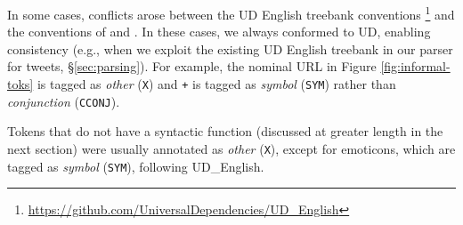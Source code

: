 \documentclass[11pt,a4paper]{article}
\newcommand{\yjcomment}[1]{\textcolor{orange}{[$_\mathrm{L}^\mathrm{Y}$#1]}}
\begin{document}
In some cases, conflicts arose between the UD English 
treebank conventions \cite[UD\_English]{Marneffe2014UniversalSD}
\footnote{\url{https://github.com/UniversalDependencies/UD_English}}
and the conventions of  and
.  In these cases, we always
conformed to UD, enabling consistency (e.g., when we exploit the
existing UD English treebank in our parser for tweets, \S\ref{sec:parsing}).  For example,  
the nominal URL in Figure \ref{fig:informal-toks} is tagged as {\it
  other} ({\tt X}) and {\tt +} is tagged as {\it symbol} ({\tt SYM})
rather than {\it conjunction} ({\tt CCONJ}).  

Tokens that do not have a syntactic function (discussed at greater
length in the next section) were usually annotated as \emph{other}
(\texttt{X}), except for emoticons, which are tagged as \emph{symbol}
(\texttt{SYM}), following UD\_English.  


\end{document}
